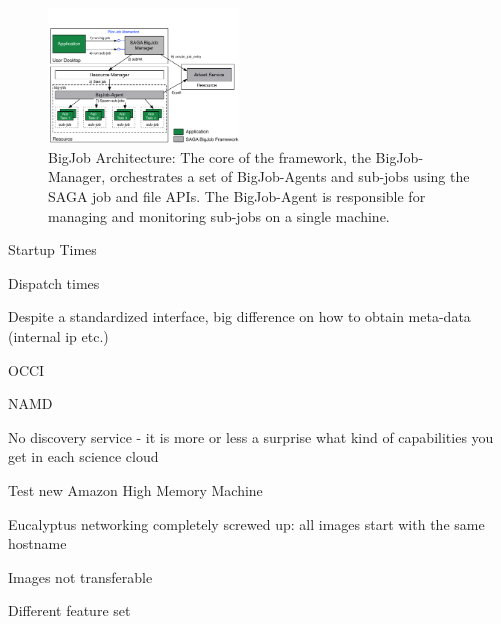 \documentclass[conference,final]{IEEEtran}
\begin{document}
\begin{figure}[htbp]
    \centering
    \includegraphics[width=0.45\textwidth]{figures/bigjob}
    \caption{BigJob Architecture: The core of the framework, the BigJob-Manager,
     orchestrates a set of BigJob-Agents and sub-jobs using the SAGA job and file APIs. 
     The BigJob-Agent is responsible for managing and monitoring sub-jobs on a 
     single machine.}
    \label{fig:figures_bigjob}
\end{figure}



Startup Times

Dispatch times



Despite a standardized interface, big difference on how to obtain meta-data (internal ip etc.)

OCCI



NAMD

No discovery service - it is more or less a surprise what kind of capabilities you get in each science cloud

Test new Amazon High Memory Machine

Eucalyptus networking completely screwed up: all images start with the same hostname

Images not transferable

Different feature set

\end{document}
